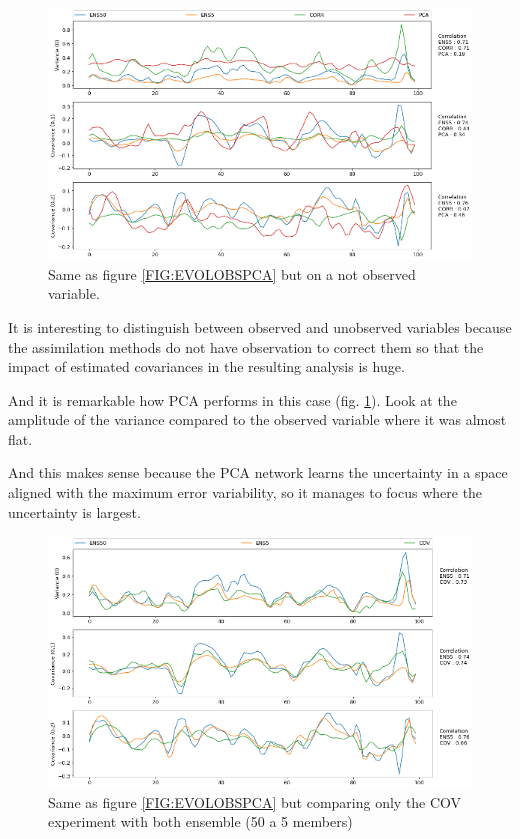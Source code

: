 \documentclass[num-refs]{wiley-article}
\begin{document}
\begin{figure}[hbt!]
        \includegraphics[width=\textwidth]{images/evolObsPCA.png}
        \caption{Same as figure \ref{FIG:EVOLOBSPCA} but on a not observed variable.}
\label{FIG:EVOLNOBSPCA}
\end{figure}
It is interesting to distinguish between observed and unobserved variables because the assimilation methods do not have observation  to correct them so that  the impact of estimated covariances in the resulting analysis is huge.

And it is remarkable how PCA performs in this case (fig. \ref{FIG:EVOLNOBSPCA}). 
Look at the amplitude of the variance compared to the observed variable where it was almost flat. 

And this makes sense because the PCA network learns the uncertainty in a space aligned with the maximum error variability, so it manages to focus where the uncertainty is largest.

\begin{figure}[hbt!]
        \includegraphics[width=\textwidth]{images/evolObsCOV.png}
        \caption{Same as figure \ref{FIG:EVOLOBSPCA} but comparing only the COV experiment with both ensemble (50 a 5 members)}
\label{FIG:EVOLOBSCOV}
\end{figure}
\end{document}

